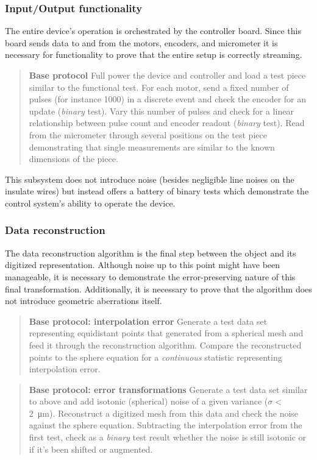 \documentclass{article}
\begin{document}
\subsubsection{Input/Output functionality}
The entire device's operation is orchestrated by the controller board. Since this board sends data to and from the motors, encoders, and micrometer it is necessary for functionality to prove that the entire setup is correctly streaming.

\begin{quotation}
  \textbf{Base protocol} Full power the device and controller and load   a test piece similar to the functional test. For each motor, send a   fixed number of pulses (for instance 1000) in a discrete event and   check the encoder for an update (\textit{binary} test). Vary this   number of pulses and check for a linear relationship between pulse   count and encoder readout (\textit{binary} test). Read from the   micrometer through several positions on the test piece demonstrating   that single measurements are similar to the known dimensions of the   piece.
\end{quotation}

This subsystem does not introduce noise (besides negligible line noises on the insulate wires) but instead offers a battery of binary tests which demonstrate the control system's ability to operate the device.

\subsubsection{Data reconstruction}
The data reconstruction algorithm is the final step between the object and its digitized representation. Although noise up to this point might have been manageable, it is necessary to demonstrate the error-preserving nature of this final transformation. Additionally, it is necessary to prove that the algorithm does not introduce geometric aberrations itself.

\begin{quotation}
  \textbf{Base protocol: interpolation error} Generate a test data set   representing equidistant points that generated from a spherical mesh   and feed it through the reconstruction algorithm. Compare the   reconstructed points to the sphere equation for a   \textit{continuous} statistic representing interpolation error.
\end{quotation}

\begin{quotation}
  \textbf{Base protocol: error transformations} Generate a test data   set similar to above and add isotonic (spherical) noise of a given   variance ($\sigma <$ \SI{2}{\micro m}). Reconstruct a digitized mesh   from this data and check the noise against the sphere equation.   Subtracting the interpolation error from the first test, check as a   \textit{binary} test result whether the noise is still isotonic or   if it's been shifted or augmented.
\end{quotation}
\end{document}
